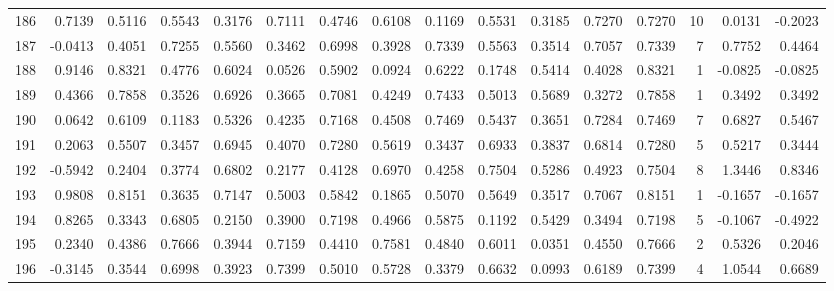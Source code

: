 \begin{tabular}{lrrrrrrrrrrrrrrr}
186 &      0.7139 &  0.5116 &  0.5543 &  0.3176 &  0.7111 &  0.4746 &  0.6108 &  0.1169 &  0.5531 &  0.3185 &   0.7270 &     0.7270 &     10 &                    0.0131 &                    -0.2023 \\
187 &     -0.0413 &  0.4051 &  0.7255 &  0.5560 &  0.3462 &  0.6998 &  0.3928 &  0.7339 &  0.5563 &  0.3514 &   0.7057 &     0.7339 &      7 &                    0.7752 &                     0.4464 \\
188 &      0.9146 &  0.8321 &  0.4776 &  0.6024 &  0.0526 &  0.5902 &  0.0924 &  0.6222 &  0.1748 &  0.5414 &   0.4028 &     0.8321 &      1 &                   -0.0825 &                    -0.0825 \\
189 &      0.4366 &  0.7858 &  0.3526 &  0.6926 &  0.3665 &  0.7081 &  0.4249 &  0.7433 &  0.5013 &  0.5689 &   0.3272 &     0.7858 &      1 &                    0.3492 &                     0.3492 \\
190 &      0.0642 &  0.6109 &  0.1183 &  0.5326 &  0.4235 &  0.7168 &  0.4508 &  0.7469 &  0.5437 &  0.3651 &   0.7284 &     0.7469 &      7 &                    0.6827 &                     0.5467 \\
191 &      0.2063 &  0.5507 &  0.3457 &  0.6945 &  0.4070 &  0.7280 &  0.5619 &  0.3437 &  0.6933 &  0.3837 &   0.6814 &     0.7280 &      5 &                    0.5217 &                     0.3444 \\
192 &     -0.5942 &  0.2404 &  0.3774 &  0.6802 &  0.2177 &  0.4128 &  0.6970 &  0.4258 &  0.7504 &  0.5286 &   0.4923 &     0.7504 &      8 &                    1.3446 &                     0.8346 \\
193 &      0.9808 &  0.8151 &  0.3635 &  0.7147 &  0.5003 &  0.5842 &  0.1865 &  0.5070 &  0.5649 &  0.3517 &   0.7067 &     0.8151 &      1 &                   -0.1657 &                    -0.1657 \\
194 &      0.8265 &  0.3343 &  0.6805 &  0.2150 &  0.3900 &  0.7198 &  0.4966 &  0.5875 &  0.1192 &  0.5429 &   0.3494 &     0.7198 &      5 &                   -0.1067 &                    -0.4922 \\
195 &      0.2340 &  0.4386 &  0.7666 &  0.3944 &  0.7159 &  0.4410 &  0.7581 &  0.4840 &  0.6011 &  0.0351 &   0.4550 &     0.7666 &      2 &                    0.5326 &                     0.2046 \\
196 &     -0.3145 &  0.3544 &  0.6998 &  0.3923 &  0.7399 &  0.5010 &  0.5728 &  0.3379 &  0.6632 &  0.0993 &   0.6189 &     0.7399 &      4 &                    1.0544 &                     0.6689 \\

\end{tabular}
